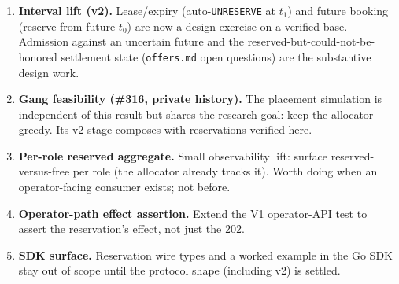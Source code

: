 \documentclass[11pt]{article}
\newcommand{\code}[1]{\texttt{#1}}
\begin{document}
\begin{enumerate}
\item \textbf{Interval lift (v2).} Lease/expiry (auto-\code{UNRESERVE} at
  $t_1$) and future booking (reserve from future $t_0$) are now a design
  exercise on a verified base. Admission against an uncertain future and
  the reserved-but-could-not-be-honored settlement state (\code{offers.md}
  open questions) are the substantive design work.
\item \textbf{Gang feasibility
  (\#316, private history).} The
  placement simulation is independent of this result but shares the
  research goal: keep the allocator greedy. Its v2 stage composes with
  reservations verified here.
\item \textbf{Per-role reserved aggregate.} Small observability lift:
  surface reserved-versus-free per role (the allocator already tracks it).
  Worth doing when an operator-facing consumer exists; not before.
\item \textbf{Operator-path effect assertion.} Extend the V1 operator-API
  test to assert the reservation's effect, not just the 202.
\item \textbf{SDK surface.} Reservation wire types and a worked example in
  the Go SDK stay out of scope until the protocol shape (including v2) is
  settled.
\end{enumerate}
\end{document}
